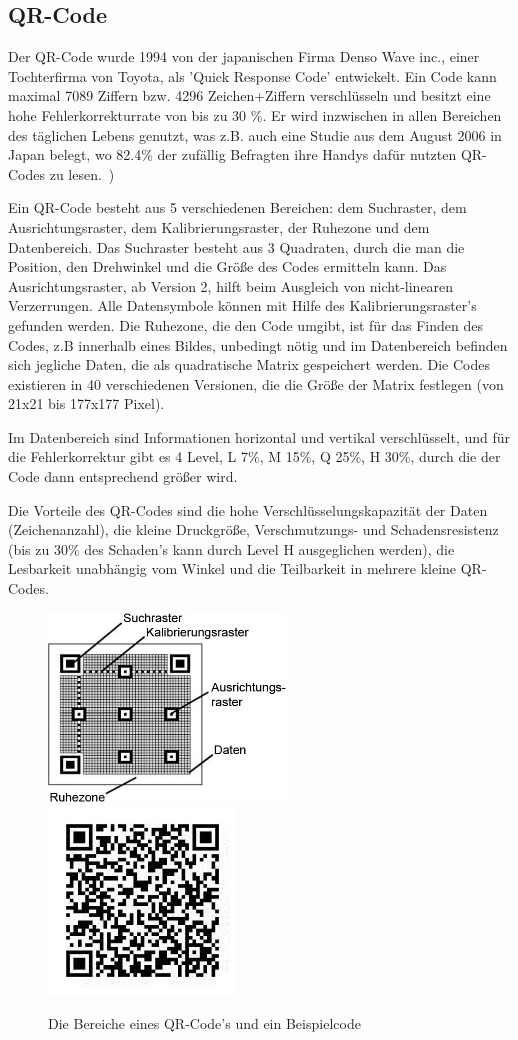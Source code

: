 \subsection*{QR-Code}
Der QR-Code wurde 1994 von der japanischen Firma Denso Wave inc., einer Tochterfirma von Toyota, als 'Quick Response Code' entwickelt. Ein Code kann maximal 7089 Ziffern bzw. 4296 Zeichen+Ziffern verschlüsseln und besitzt eine hohe Fehlerkorrekturrate von bis zu 30 \%. Er wird inzwischen in allen Bereichen des täglichen Lebens genutzt, was z.B. auch eine Studie aus dem August 2006 in Japan belegt, wo 82.4\% der zufällig Befragten ihre Handys dafür nutzten QR-Codes zu lesen.~\cite{Furht2011})

Ein QR-Code besteht aus 5 verschiedenen Bereichen: dem Suchraster, dem Ausrichtungsraster, dem Kalibrierungsraster, der Ruhezone und dem Datenbereich. Das Suchraster besteht aus 3 Quadraten, durch die man die Position, den Drehwinkel und die Größe des Codes ermitteln kann. Das Ausrichtungsraster, ab Version 2, hilft beim Ausgleich von nicht-linearen Verzerrungen. Alle Datensymbole können mit Hilfe des Kalibrierungsraster's gefunden werden. Die Ruhezone, die den Code umgibt, ist für das Finden des Codes, z.B innerhalb eines Bildes, unbedingt nötig und im Datenbereich befinden sich jegliche Daten, die als quadratische Matrix gespeichert werden. Die Codes existieren in 40 verschiedenen Versionen, die die Größe der Matrix festlegen (von 21x21 bis 177x177 Pixel).

Im Datenbereich sind Informationen horizontal und vertikal verschlüsselt, und für die Fehlerkorrektur gibt es 4 Level, L 7\%, M 15\%, Q 25\%, H 30\%, durch die der Code dann entsprechend größer wird.

Die Vorteile des QR-Codes sind die hohe Verschlüsselungskapazität der Daten (Zeichenanzahl), die kleine Druckgröße, Verschmutzungs- und Schadensresistenz (bis zu 30\% des Schaden's kann durch Level H ausgeglichen werden), die Lesbarkeit unabhängig vom Winkel und die Teilbarkeit in mehrere kleine QR-Codes.~\cite{DensoWave2010}

\begin{figure}[H]
  \centering
  \includegraphics[height=5cm]{img/QR/Aufbau_qr-codes.jpg}
  \includegraphics[height=5cm]{img/QR/perfect_03.jpg}
  \caption{Die Bereiche eines QR-Code's und ein Beispielcode}
  \label{fig:qrexample}
\end{figure}